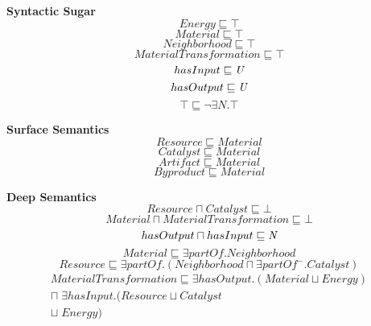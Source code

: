 \documentclass[10pt,a4paper,fleqn]{article}
\begin{document}
\textbf{Syntactic Sugar}
\begin{equation}
Energy \sqsubseteq \top
\end{equation}
\begin{equation}
Material \sqsubseteq \top
\end{equation}
\begin{equation}
Neighborhood \sqsubseteq \top
\end{equation}
\begin{equation}
MaterialTransformation \sqsubseteq \top
\end{equation}
\begin{equation}
hasInput \sqsubseteq \emph{U}
\end{equation}
\begin{equation}
hasOutput \sqsubseteq \emph{U}
\end{equation}
\begin{equation}
\top \sqsubseteq \lnot \exists N.\top
\end{equation}

\textbf{Surface Semantics}
\begin{equation}
Resource \sqsubseteq Material
\end{equation}
\begin{equation}
Catalyst \sqsubseteq Material
\end{equation}
\begin{equation}
 Artifact \sqsubseteq Material
\end{equation}
\begin{equation}
Byproduct \sqsubseteq Material
\end{equation}

\textbf{Deep Semantics}
\begin{equation}
Resource \sqcap Catalyst \sqsubseteq \bot
\end{equation}
\begin{equation}
Material \sqcap MaterialTransformation \sqsubseteq \bot
\end{equation}
\begin{equation}
hasOutput \sqcap hasInput \sqsubseteq \emph{N}
\end{equation}
\begin{equation}
Material \sqsubseteq \exists partOf. Neighborhood
\end{equation}
\begin{equation}
Resource \sqsubseteq
    \exists partOf.(Neighborhood \sqcap \exists partOf^-.Catalyst) 
\end{equation}
\begin{align}
MaterialTransformation \sqsubseteq \exists hasOutput. (Material \sqcup Energy)\\\nonumber \sqcap \; \exists hasInput. (Resource \sqcup Catalyst\\\nonumber \sqcup \; Energy)
\end{align}
\end{document}
